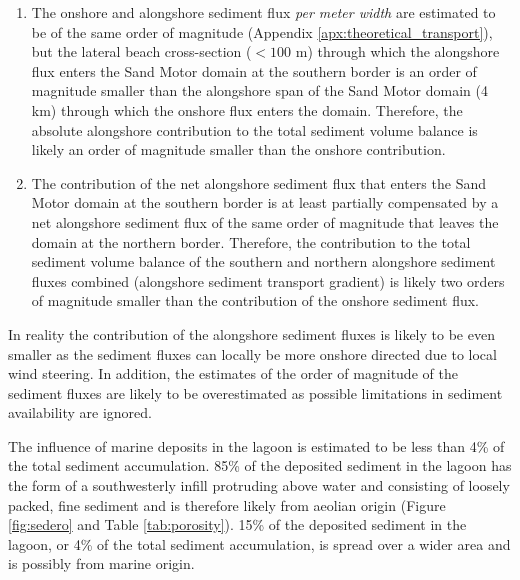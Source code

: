 \begin{enumerate}
\item The onshore and alongshore sediment flux \emph{per meter width}
  are estimated to be of the same order of magnitude (Appendix
  \ref{apx:theoretical_transport}), but the lateral beach
  cross-section ($< 100$ m) through which the alongshore flux enters
  the Sand Motor domain at the southern border is an order of
  magnitude smaller than the alongshore span of the Sand Motor domain
  (4 km) through which the onshore flux enters the domain. Therefore,
  the absolute alongshore contribution to the total sediment volume
  balance is likely an order of magnitude smaller than the onshore
  contribution.
\item The contribution of the net alongshore sediment flux that enters
  the Sand Motor domain at the southern border is at least partially
  compensated by a net alongshore sediment flux of the same order of
  magnitude that leaves the domain at the northern border. Therefore,
  the contribution to the total sediment volume balance of the
  southern and northern alongshore sediment fluxes combined
  (alongshore sediment transport gradient) is likely two orders of
  magnitude smaller than the contribution of the onshore sediment
  flux.
\end{enumerate}

\noindent In reality the contribution of the alongshore sediment
fluxes is likely to be even smaller as the sediment fluxes can locally
be more onshore directed due to local wind steering. In addition, the
estimates of the order of magnitude of the sediment fluxes are likely
to be overestimated as possible limitations in sediment availability
are ignored.


The influence of marine deposits in the lagoon is estimated to be less
than 4\% of the total sediment accumulation. 85\% of the deposited
sediment in the lagoon has the form of a southwesterly infill
protruding above water and consisting of loosely packed, fine sediment
and is therefore likely from aeolian origin (Figure \ref{fig:sedero}
and Table \ref{tab:porosity}). 15\% of the deposited sediment in the
lagoon, or 4\% of the total sediment accumulation, is spread over a
wider area and is possibly from marine origin.

